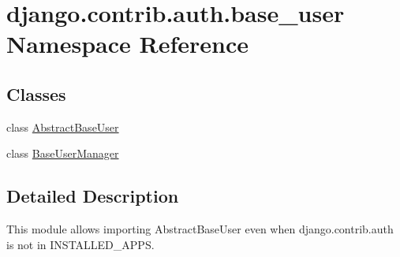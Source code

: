 \hypertarget{namespacedjango_1_1contrib_1_1auth_1_1base__user}{}\section{django.\+contrib.\+auth.\+base\+\_\+user Namespace Reference}
\label{namespacedjango_1_1contrib_1_1auth_1_1base__user}
\subsection*{Classes}
\begin{DoxyCompactItemize}
\item 
class \mbox{\hyperlink{classdjango_1_1contrib_1_1auth_1_1base__user_1_1_abstract_base_user}{Abstract\+Base\+User}}
\item 
class \mbox{\hyperlink{classdjango_1_1contrib_1_1auth_1_1base__user_1_1_base_user_manager}{Base\+User\+Manager}}
\end{DoxyCompactItemize}


\subsection{Detailed Description}
\begin{DoxyVerb}This module allows importing AbstractBaseUser even when django.contrib.auth is
not in INSTALLED_APPS.
\end{DoxyVerb}
 